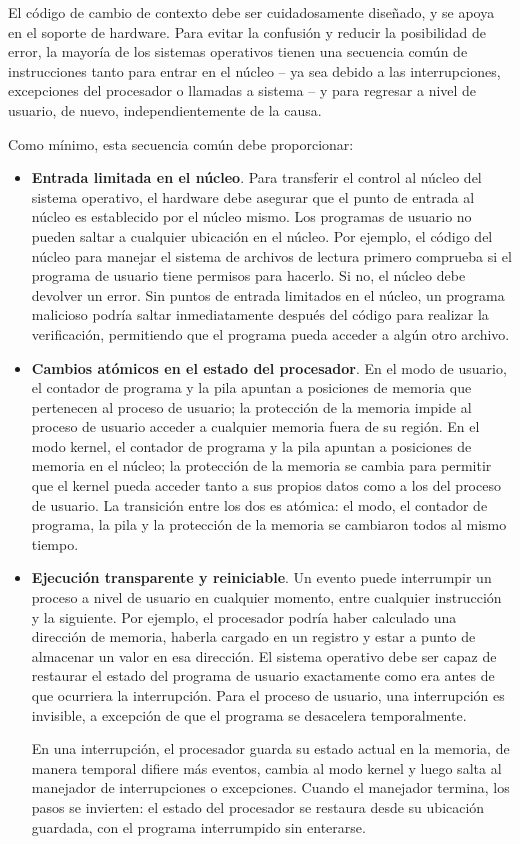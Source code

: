 \documentclass[10pt]{book}
\begin{document}
El código de cambio de contexto debe ser cuidadosamente diseñado, y se apoya en el soporte de hardware. Para evitar la confusión y reducir la posibilidad de error, la mayoría de los sistemas operativos tienen una secuencia común de instrucciones tanto para entrar en el núcleo -- ya sea debido a las interrupciones, excepciones del procesador o llamadas a sistema -- y para regresar a nivel de usuario, de nuevo, independientemente de la causa.

Como mínimo, esta secuencia común debe proporcionar:
\begin{itemize}
\item \textbf{Entrada limitada en el núcleo}. Para transferir el control al núcleo del sistema operativo, el hardware debe asegurar que el punto de entrada al núcleo es establecido por el núcleo mismo. Los programas de usuario no pueden saltar a cualquier ubicación en el núcleo. Por ejemplo, el código del núcleo para manejar el sistema de archivos de lectura primero comprueba si el programa de usuario tiene permisos para hacerlo. Si no, el núcleo debe devolver un error. Sin puntos de entrada limitados en el núcleo, un programa malicioso podría saltar inmediatamente después del código para realizar la verificación, permitiendo que el programa pueda acceder a algún otro archivo.

\item \textbf{Cambios atómicos en el estado del procesador}. En el modo de usuario, el contador de programa y la pila apuntan a posiciones de memoria que pertenecen al proceso de usuario; la protección de la memoria impide al proceso de usuario acceder a cualquier memoria fuera de su región. En el modo kernel, el contador de programa y la pila apuntan a posiciones de memoria en el núcleo; la protección de la memoria se cambia para permitir que el kernel pueda acceder tanto a sus propios datos como a los del proceso de usuario. La transición entre los dos es atómica: el modo, el contador de programa, la pila y la protección de la memoria se cambiaron todos al mismo tiempo.

\item \textbf{Ejecución transparente y reiniciable}. Un evento puede interrumpir un proceso a nivel de usuario en cualquier momento, entre cualquier instrucción y la siguiente. Por ejemplo, el procesador podría haber calculado una dirección de memoria, haberla cargado en un registro y estar a punto de almacenar un valor en esa dirección. El sistema operativo debe ser capaz de restaurar el estado del programa de usuario exactamente como era antes de que ocurriera la interrupción. Para el proceso de usuario, una interrupción es invisible, a excepción de que el programa se desacelera temporalmente.

En una interrupción, el procesador guarda su estado actual en la memoria, de manera temporal difiere más eventos, cambia al modo kernel y luego salta al manejador de interrupciones o excepciones. Cuando el manejador termina, los pasos se invierten: el estado del procesador se restaura desde su ubicación guardada, con el programa interrumpido sin enterarse.
\end{itemize}
\end{document}

